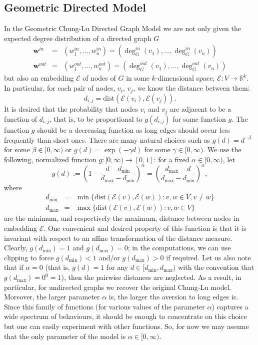 \documentclass[11pt]{article}
\newcommand{\R}{{\mathbb R}}
\newcommand{\dist}{\mathrm{dist}}
\newcommand{\emb}{\mathcal E}
\begin{document}
\subsection{Geometric Directed Model}\label{sec:geom_dir_model}

In the Geometric Chung-Lu Directed Graph Model we are not only given the expected degree distribution of a directed graph $G$
\begin{eqnarray*}
\textbf{w}^{in} &=& (w_1^{in}, \ldots, w_n^{in}) = (\deg^{in}_G(v_1), \ldots, \deg^{in}_G(v_n)) \\
\textbf{w}^{out} &=& (w_1^{out}, \ldots, w_n^{out}) = (\deg^{out}_G(v_1), \ldots, \deg^{out}_G(v_n))
\end{eqnarray*}
but also an embedding $\emb$ of nodes of $G$ in some $k$-dimensional space, $\emb : V \to \R^k$. In particular, for each pair of nodes, $v_i$, $v_j$, we know the distance between them:
$$
d_{i,j} = \dist( \emb(v_i), \emb(v_j)).
$$
It is desired that the probability that nodes $v_i$ and $v_j$ are adjacent to be a function of $d_{i,j}$, that is, to be proportional to $g(d_{i,j})$ for some function $g$. The function $g$ should be a decreasing function as long edges should occur less frequently than short ones. There are many natural choices such as $g(d) = d^{-\beta}$ for some $\beta \in [0, \infty)$ or $g(d) = \exp(-\gamma d)$ for some $\gamma \in [0, \infty)$. We use the following, normalized function $g:[0,\infty) \to [0,1]$: for a fixed $\alpha \in [0,\infty)$, let
$$
g(d) := \left( 1 - \frac{d - d_{\min}}{d_{\max} - d_{\min}} \right)^{\alpha} = \left( \frac{d_{\max} - d}{d_{\max} - d_{\min}} \right)^{\alpha},
$$
where
\begin{eqnarray*}
d_{\min} &=& \min \{ \dist(\emb(v), \emb(w)): v,w \in V,  v\neq w\} \\
d_{\max} &=& \max \{ \dist(\emb(v), \emb(w)): v,w \in V \}
\end{eqnarray*}
are the minimum, and respectively the maximum, distance between nodes in embedding $\emb$. One convenient and desired property of this function is that it is invariant with respect to an affine transformation of the distance measure. Clearly, $g(d_{\min})=1$ and $g(d_{\max})=0$; in the computations, we can use clipping to force $g(d_{\min})<1$
and/or $g(d_{\max})>0$ if required.
Let us also note that if $\alpha = 0$ (that is, $g(d)=1$ for any $d \in [d_{\min},d_{\max})$ with the convention that $g(d_{\max})=0^0=1$), then the pairwise distances are neglected. As a result, in particular, for undirected graphs we recover the original Chung-Lu model. Moreover, the larger parameter $\alpha$ is, the larger the aversion to long edges is. Since this family of functions (for various values of the parameter $\alpha$) captures a wide spectrum of behaviours, it should be enough to concentrate on this choice but one can easily experiment with other functions. So, for now we may assume that the only parameter of the model is $\alpha \in [0,\infty)$.
\end{document}
